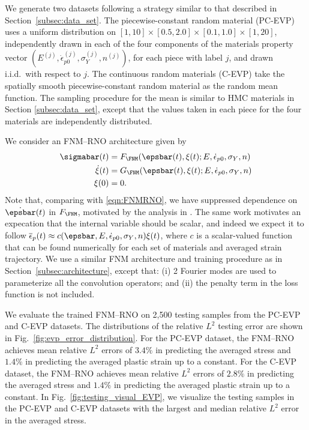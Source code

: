 \documentclass[letterpaper,11pt]{article}
\begin{document}
We generate two datasets following a strategy similar to that described in Section~\ref{subsec:data_set}. The piecewise-constant random material (PC-EVP) uses a uniform distribution on $[1, 10]\times[0.5, 2.0]\times[0.1, 1.0]\times[1, 20]$, independently drawn in each of the four components of the materials property vector $(E^{(j)}, \dot{\epsilon}_{p0}^{(j)}, \sigma_Y^{(j)}, n^{(j)})$, for each piece with
label $j$, and drawn i.i.d.\ with respect to $j$. The continuous random materials (C-EVP) take the spatially smooth piecewise-constant random material as the random mean function. The sampling procedure for the mean is similar to HMC materials in Section \ref{subsec:data_set}, except that the values taken in each piece for the four materials are independently distributed.


We consider an FNM--RNO architecture given by
\begin{subequations}\label{eqn:RNOevp}
\begin{align}
    \sigmabar(t) &= F_{\FNM}(\epsbar(t), \xi(t); E, \dot{\epsilon}_{p0}, \sigma_Y,n)\\
    \dot{\xi}(t) &= G_{\FNM}(\epsbar(t), \xi(t); E, \dot{\epsilon}_{p0}, \sigma_Y,n)\\
    \xi(0) &= 0.
\end{align}
\end{subequations}
Note that, comparing with \eqref{eqn:FNMRNO}, we have suppressed dependence
on $\dot{\epsbar}(t)$ in $F_{\FNM}$, motivated by the analysis in \cite{liu2023learning}. The same work motivates an expecation that the internal variable should be scalar, and indeed we expect it to follow $\overline{\epsilon}_p(t) \approx c(\epsbar, E, \dot{\epsilon}_{p0}, \sigma_Y,n)\xi(t)$, where $c$ is a scalar-valued function that can be found numerically for each set of materials and averaged strain trajectory. We use a similar FNM architecture and training procedure as in Section~\ref{subsec:architecture}, except that: (i) 2 Fourier modes are used to parameterize all the convolution operators; and (ii) the penalty term in the loss function is not included.

We evaluate the trained FNM--RNO on 2,500 testing samples from the PC-EVP and C-EVP datasets. The distributions of the relative $L^2$ testing error are shown in Fig.~\ref{fig:evp_error_distribution}. For the PC-EVP dataset, the FNM--RNO achieves mean relative $L^2$ errors of $3.4\%$ in predicting the averaged stress and $1.4\%$ in predicting the averaged plastic strain up to a constant. For the C-EVP dataset, the FNM--RNO achieves mean relative $L^2$ errors of $2.8\%$ in predicting the averaged stress and $1.4\%$ in predicting the averaged plastic strain up to a constant. In Fig.~\ref{fig:testing_visual_EVP}, we visualize the testing samples in the PC-EVP and C-EVP datasets with the largest and median relative $L^2$ error in the averaged stress.
\end{document}

